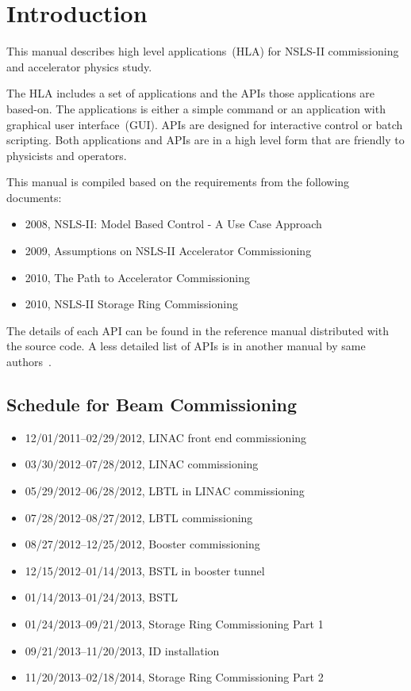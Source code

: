 \documentclass[11pt,oneside,letterpaper,showtrims,article]{memoir}
\begin{document}
\newpage
\thispagestyle{empty}
\setcounter{tocdepth}{3}
\tableofcontents*


\chapter{Introduction}

This manual describes high level applications~(HLA) for NSLS-II
commissioning and accelerator physics study.

The HLA includes a set of applications and the APIs those applications are
based-on. The applications is either a simple command or an application
with graphical user interface~(GUI). APIs are designed for
interactive control or batch scripting. Both applications and APIs are in
a high level form that are friendly to physicists and operators.

This manual is compiled based on the requirements from the following
documents:
\begin{itemize}
\item 2008, NSLS-II: Model Based Control - A Use Case Approach~\cite{bengtsson_2008_nsls-ii}
\item 2009, Assumptions on NSLS-II Accelerator Commissioning~\cite{willeke_2009_assumptions}
\item 2010, The Path to Accelerator Commissioning~\cite{willeke_2010_path}
\item 2010, NSLS-II Storage Ring Commissioning~\cite{krinsky_2010_nsls-ii}
\end{itemize}

The details of each API can be found in the reference manual distributed
with the source code. A less detailed list of APIs is in
another manual by same authors~\cite{shen_hla_apis}.

\section{Schedule for Beam Commissioning}

\vspace{5ex}
\begin{itemize}
\item 12/01/2011--02/29/2012, LINAC front end commissioning
\item 03/30/2012--07/28/2012, LINAC commissioning
\item 05/29/2012--06/28/2012, LBTL in LINAC commissioning
\item 07/28/2012--08/27/2012, LBTL commissioning
\item 08/27/2012--12/25/2012, Booster commissioning
\item 12/15/2012--01/14/2013, BSTL in booster tunnel
\item 01/14/2013--01/24/2013, BSTL
\item 01/24/2013--09/21/2013, Storage Ring Commissioning Part 1
\item 09/21/2013--11/20/2013, ID installation
\item 11/20/2013--02/18/2014, Storage Ring Commissioning Part 2
\end{itemize}
\end{document}
